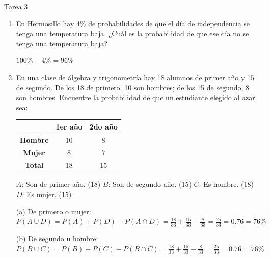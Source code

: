 \documentclass[a4paper, 12pt]{article}
\newcommand{\Pspace}{0.5cm}
\newcommand{\Aspace}{0.2cm}
\begin{document}
\newpage
\begin{center}
    { \LARGE Tarea 3}
\end{center}

\begin{enumerate}
    \item En Hermosillo hay 4\% de probabilidades de que el día de independencia se tenga una temperatura baja. ¿Cuál es la probabilidad de que ese día no se tenga una temperatura baja?
    \vspace{\Aspace} \par
    { \color{azul} $100\% - 4\% = 96\%$ }


    \vspace{\Pspace}
    \item En una clase de álgebra y trigonometría hay 18 alumnos de primer año y 15 de segundo. De los 18 de primero, 10 son hombres; de los 15 de segundo, 8 son hombres. Encuentre la probabilidad de que un estudiante elegido al azar sea:
        \begin{table}[h] \hspace{2em}
        \begin{tabular}{c|c c}  %
        \hline
        & \textbf{1er año} & \textbf{2do año} \\
        \hline
        \textbf{Hombre} & 10 & 8 \\
        \textbf{Mujer}  & 8 & 7 \\
        \hline
        \textbf{Total}  & 18 & 15 \\
        \hline
        \end{tabular}
    \end{table}
    
    $A$: Son de primer año. (18)
    \newline $B$: Son de segundo año. (15)
    \newline $C$: Es hombre. (18)
    \newline $D$: Es mujer. (15)

    \vspace{\Aspace} \par
    (a) De primero o mujer:
        \\ { \color{azul} $P(A \cup D) = P(A) + P(D) - P(A \cap D) = \frac{18}{33} + \frac{15}{33} - \frac{8}{33} = \frac{25}{33} = 0{.}76 = 76\%$ }

    \vspace{\Aspace}
    (b) De segundo u hombre:
    \\ { \color{azul} $P(B \cup C) = P(B) + P(C) - P(B \cap C) = \frac{18}{33} + \frac{15}{33} - \frac{8}{33} = \frac{25}{33} = 0{.}76 = 76\%$ }



\end{enumerate}
\end{document}

